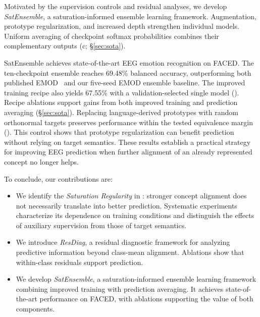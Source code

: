 Motivated by the supervision controls and residual analyses, we develop \emph{SatEnsemble}, a saturation-informed ensemble learning framework. Augmentation, prototype regularization, and increased depth strengthen individual models. Uniform averaging of checkpoint softmax probabilities combines their complementary outputs (c; \S\ref{sec:sota}).

SatEnsemble achieves state-of-the-art EEG emotion recognition on FACED. The ten-checkpoint ensemble reaches 69.48\% balanced accuracy, outperforming both published EMOD~\citep{chen2025emod} and our five-seed EMOD ensemble baseline.  The improved training recipe also yields 67.55\% with a validation-selected single model (). Recipe ablations support gains from both improved training and prediction averaging (\S\ref{sec:sota}). Replacing language-derived prototypes with random orthonormal targets preserves performance within the tested equivalence margin (). This control shows that prototype regularization can benefit prediction without relying on target semantics. These results establish a practical strategy for improving EEG prediction when further alignment of an already represented concept no longer helps.

To conclude, our contributions are:
\begin{itemize}
\item We identify the \emph{Saturation Regularity} in : stronger concept alignment does not necessarily translate into better prediction. Systematic experiments characterize its dependence on training conditions and distinguish the effects of auxiliary supervision from those of target semantics.
\item We introduce \emph{ResDiag}, a residual diagnostic framework for analyzing predictive information beyond class-mean alignment. Ablations show that within-class residuals support prediction.
\item We develop \emph{SatEnsemble}, a saturation-informed ensemble learning framework combining improved training with prediction averaging. It achieves state-of-the-art performance on FACED, with ablations supporting the value of both components.
\end{itemize}
